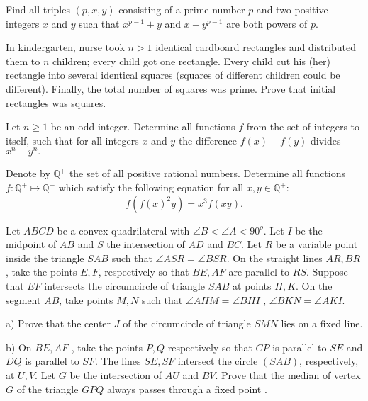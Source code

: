 \documentclass[11pt]{scrartcl}
\begin{document}
\begin{problem}[592243963244567]
	Find all triples $(p, x, y)$ consisting of a prime number $p$ and two positive integers $x$ and $y$ such that $x^{p -1} + y$ and $x + y^ {p -1}$ are both powers of $p$.
\end{problem}
\begin{problem}[181463134716189]
	In kindergarten, nurse took $n>1$ identical cardboard rectangles and distributed them to $n$ children; every child got one rectangle. Every child cut his (her) rectangle into several identical squares (squares of different children could be different). Finally, the total number of squares was prime. Prove that initial rectangles was squares.
\end{problem}
\begin{problem}[9200700111246490890]
Let $n \geq 1$ be an odd integer. Determine all functions $f$ from the set of integers to itself, such that for all integers $x$ and $y$ the difference $f(x)-f(y)$ divides $x^n-y^n.$
\end{problem}
\begin{problem}[340033255492200]
Denote by $\mathbb{Q}^+$ the set of all positive rational numbers. Determine all functions $f : \mathbb{Q}^+ \mapsto \mathbb{Q}^+$ which satisfy the following equation for all $x, y \in \mathbb{Q}^+:$\[f\left( f(x)^2y \right) = x^3 f(xy).\]
\end{problem}
\begin{problem}[1613309914397651478]
Let $ABCD$ be a convex quadrilateral with $\angle B < \angle A < 90^{o}$. Let $I$ be the midpoint of $AB$ and $S$ the intersection of $AD$ and $BC$. Let $R$ be a variable point inside the triangle $SAB$ such that $\angle ASR = \angle BSR$. On the straight lines $AR, BR$ , take the points $E, F$, respectively so that $BE , AF$ are parallel to $RS$. Suppose that $EF$ intersects the circumcircle of triangle $SAB$ at points $H, K$. On the segment $AB$, take points $M , N$ such that $\angle AHM =\angle BHI$ , $\angle BKN = \angle AKI$.

a) Prove that the center $J$ of the circumcircle of triangle $SMN$ lies on a fixed line.

b) On $BE, AF$ , take the points $P, Q$ respectively so that $CP$ is parallel to $SE$ and $DQ$ is parallel to $SF$. The lines $SE, SF$ intersect the circle $(SAB)$, respectively, at $U, V$. Let $G$ be the intersection of $AU$ and $BV$. Prove that the median of vertex $G$ of the triangle $GPQ$ always passes through a fixed point .
\end{problem}
\end{document}
